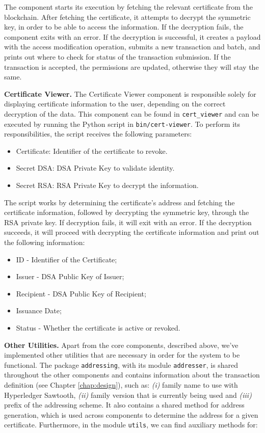 The component starts its execution by fetching the relevant certificate from the blockchain. After fetching the certificate, it attempts to decrypt the symmetric key, in order to be able to access the information. If the decryption fails, the component exits with an error. If the decryption is successful, it creates a payload with the access modification operation, submits a new transaction and batch, and prints out where to check for status of the transaction submission. If the transaction is accepted, the permissions are updated, otherwise they will stay the same.

\textbf{Certificate Viewer.} The Certificate Viewer component is responsible solely for displaying certificate information to the user, depending on the correct decryption of the data.  This component can be found in \texttt{cert\_viewer} and can be executed by running the Python script in \texttt{bin/cert-viewer}. To perform its responsibilities, the script receives the following parameters:

\begin{itemize}
	\item Certificate: Identifier of the certificate to revoke.
	\item Secret DSA: DSA Private Key to validate identity.
	\item Secret RSA: RSA Private Key to decrypt the information.
\end{itemize}

The script works by determining the certificate's address and fetching the certificate information, followed by decrypting the symmetric key, through the RSA private key. If decryption fails, it will exit with an error. If the decryption succeeds, it will proceed with decrypting the certificate information and print out the following information:

\begin{itemize}
	\item ID - Identifier of the Certificate;
	\item Issuer - DSA Public Key of Issuer;
	\item Recipient - DSA Public Key of Recipient;
	\item Issuance Date;
	\item Status - Whether the certificate is active or revoked.
\end{itemize}

\textbf{Other Utilities.} Apart from the core components, described above, we've implemented other utilities that are necessary in order for the system to be functional. The package \texttt{addressing}, with its module \texttt{addresser}, is shared throughout the other components and contains  information about the transaction definition (see Chapter \ref{chap:design}), such as: \emph{(i)} family name to use with Hyperledger Sawtooth, \emph{(ii)} family version that is currently being used and \emph{(iii)} prefix of the addressing scheme. It also contains a shared method for address generation, which is used across components to determine the address for a given certificate. Furthermore, in the module \texttt{utils}, we can find auxiliary methods for:


